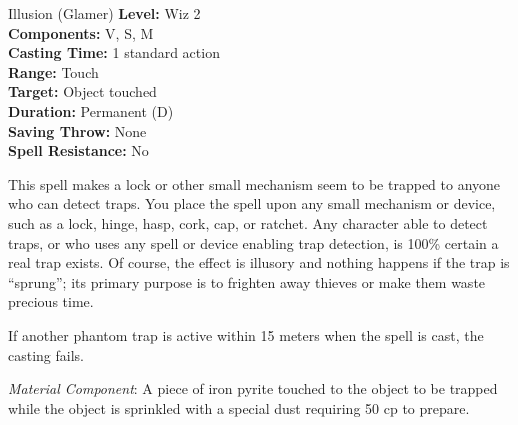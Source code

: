 {Illusion (Glamer)}
{
	\textbf{Level:}
	Wiz 2\\
	\textbf{Components:}
	V, S, M\\
	\textbf{Casting Time:}
	1 standard action\\
	\textbf{Range:}
	Touch\\
	\textbf{Target:}
	Object touched\\
	\textbf{Duration:}
	Permanent (D)\\
	\textbf{Saving Throw:}
	None\\
	\textbf{Spell Resistance:}
	No\\
}
{
	This spell makes a lock or other small mechanism seem to be trapped to anyone who can detect traps. You place the spell upon any small mechanism or device, such as a lock, hinge, hasp, cork, cap, or ratchet. Any character able to detect traps, or who uses any spell or device enabling trap detection, is 100\% certain a real trap exists. Of course, the effect is illusory and nothing happens if the trap is ``sprung''; its primary purpose is to frighten away thieves or make them waste precious time.

	If another phantom trap is active within 15 meters when the spell is cast, the casting fails.

	\textit{Material Component}:
	A piece of iron pyrite touched to the object to be trapped while the object is sprinkled with a special dust requiring 50 cp to prepare.

}

